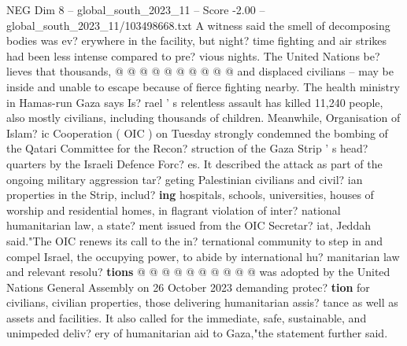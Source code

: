 \begin{textsample}{NEG Dim 8 – global\_south\_2023\_11 – Score -2.00 – global\_south\_2023\_11/103498668.txt}
A witness said the smell of decomposing bodies was ev? erywhere in the facility, but night? time fighting and air strikes had been less intense compared to pre? vious nights.
The United Nations be? lieves that thousands, @ @ @ @ @ @ @ @ @ @ and displaced civilians -- may be inside and unable to escape because of fierce fighting nearby.
The health ministry in Hamas-run Gaza says Is? rael ' s relentless assault has killed 11,240 people, also mostly civilians, including thousands of children.
Meanwhile, Organisation of Islam? ic Cooperation ( OIC ) on Tuesday strongly condemned the bombing of the Qatari Committee for the Recon? struction of the Gaza Strip ' s head? quarters by the Israeli Defence Forc? es.
It described the attack as part of the ongoing military aggression tar? geting Palestinian civilians and civil? ian properties in the Strip, includ? \textbf{ing} hospitals, schools, universities, houses of worship and residential homes, in flagrant violation of inter? national humanitarian law, a state? ment issued from the OIC Secretar? iat, Jeddah said."The OIC renews its call to the in? ternational community to step in and compel Israel, the occupying power, to abide by international hu? manitarian law and relevant resolu? \textbf{tions} @ @ @ @ @ @ @ @ @ @ was adopted by the United Nations General Assembly on 26 October 2023 demanding protec? \textbf{tion} for civilians, civilian properties, those delivering humanitarian assis? tance as well as assets and facilities.
It also called for the immediate, safe, sustainable, and unimpeded deliv? ery of humanitarian aid to Gaza,"the statement further said.

\end{textsample}
